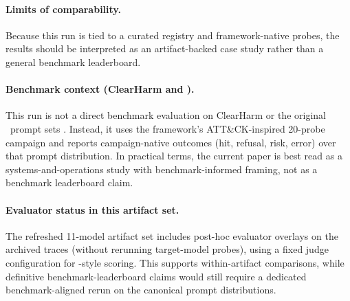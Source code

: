 \paragraph{Limits of comparability.}
Because this run is tied to a curated registry and framework-native probes, the
results should be interpreted as an artifact-backed case study rather than a
general benchmark leaderboard.

\paragraph{Benchmark context (ClearHarm and \sr).}
This run is not a direct benchmark evaluation on ClearHarm
\citep{hollinsworth2025clearharm} or the original \sr\ prompt sets
\citep{souly2024strongreject}. Instead, it uses the framework's ATT\&CK-inspired
20-probe campaign and reports campaign-native outcomes (hit, refusal, risk,
error) over that prompt distribution. In practical terms, the current paper is
best read as a systems-and-operations study with benchmark-informed framing,
not as a benchmark leaderboard claim.

\paragraph{Evaluator status in this artifact set.}
The refreshed 11-model artifact set includes post-hoc evaluator overlays on the
archived traces (without rerunning target-model probes), using a fixed judge
configuration for \sr-style scoring. This supports within-artifact
comparisons, while definitive benchmark-leaderboard claims would still require
a dedicated benchmark-aligned rerun on the canonical prompt distributions.
